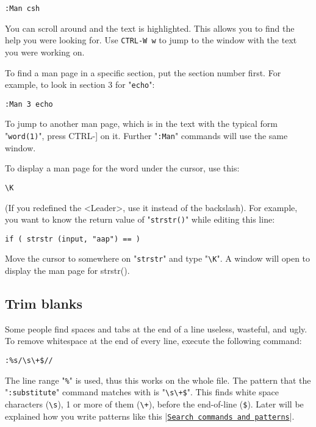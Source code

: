 \begin{Verbatim}[samepage=true]
 :Man csh
\end{Verbatim}

You can scroll around and the text is highlighted.
This allows you to find the help you were looking for.
Use \texttt{CTRL-W w} to jump to the window with the text you were working on.

To find a man page in a specific section, put the section number first.
For example, to look in section 3 for "\texttt{echo}":

\begin{Verbatim}[samepage=true]
 :Man 3 echo
\end{Verbatim}

To jump to another man page, which is in the text with the typical form "\texttt{word(1)}", press CTRL-] on it.
Further "\texttt{:Man}" commands will use the same window.

To display a man page for the word under the cursor, use this:

\begin{Verbatim}[samepage=true]
 \K
\end{Verbatim}

(If you redefined the <Leader>, use it instead of the backslash).
For example, you want to know the return value of "\texttt{strstr()}" while editing
this line:

\begin{Verbatim}[samepage=true]
    if ( strstr (input, "aap") == ) 
\end{Verbatim}

Move the cursor to somewhere on "\texttt{strstr}" and type "\texttt{\textbackslash{}K}".
A window will open to display the man page for strstr().
\subsection{Trim blanks}
Some people find spaces and tabs at the end of a line useless, wasteful, and ugly.
To remove whitespace at the end of every line, execute the following command:

\begin{Verbatim}[samepage=true]
 :%s/\s\+$//
\end{Verbatim}

The line range "\texttt{\%}" is used, thus this works on the whole file.
The pattern that the "\texttt{:substitute}" command matches with is "\texttt{\textbackslash{}s\textbackslash{}+\$}".
This finds white space characters (\texttt{\textbackslash{}s}), 1 or more of them (\texttt{\textbackslash{}+}), before the end-of-line (\texttt{\$}).
Later will be explained how you write patterns like this |\hyperref[Search commands and patterns]{\texttt{Search commands and patterns}}|.

